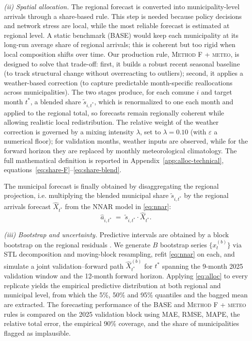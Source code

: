\documentclass[11pt,a4paper]{article}
\begin{document}
\medskip
\noindent\textit{(ii) Spatial allocation.} The regional forecast is converted into municipality-level arrivals through a share-based rule. This step is needed because policy decisions and network stress are local, while the most reliable forecast is estimated at regional level. A static benchmark (BASE) would keep each municipality at its long-run average share of regional arrivals; this is coherent but too rigid when local composition shifts over time. Our production rule, \textsc{Method F + meteo}, is designed to solve that trade-off: first, it builds a robust recent seasonal baseline (to track structural change without overreacting to outliers); second, it applies a weather-based correction (to capture predictable month-specific reallocations across municipalities). The two stages produce, for each comune $i$ and target month $t^{*}$, a blended share $\widetilde{s}_{i,t^{*}}$, which is renormalized to one each month and applied to the regional total, so forecasts remain regionally coherent while allowing realistic local redistribution. The relative weight of the weather correction is governed by a mixing intensity $\lambda$, set to $\lambda = 0.10$ (with $\varepsilon$ a numerical floor); for validation months, weather inputs are observed, while for the forward horizon they are replaced by monthly meteorological climatology. The full mathematical definition is reported in Appendix~\ref{app:alloc-technical}, equations~\eqref{eq:share-F}--\eqref{eq:share-blend}.

The municipal forecast is finally obtained by disaggregating the regional projection, i.e. multiplying the blended municipal share $\widetilde{s}_{i,t^{*}}$ by the regional arrivals forecast $\widehat{X}_{t^{*}}$ from the NNAR model in \eqref{eq:nnar}:
\begin{equation}
\label{eq:alloc}
\widehat{a}_{i,t^{*}} \;=\; \widetilde{s}_{i,t^{*}} \cdot \widehat{X}_{t^{*}}.
\end{equation}

\medskip
\noindent\textit{(iii) Bootstrap and uncertainty.} Predictive intervals are obtained by a block bootstrap on the regional residuals \citep{bergmeir2016}. We generate $B$ bootstrap series $\{x_t^{(b)}\}$ via STL decomposition and moving-block resampling, refit \eqref{eq:nnar} on each, and simulate a joint validation–forward path $\widehat{X}_{t^{*}}^{(b)}$ for $t^{*}$ spanning the 9-month 2025 validation window and the 12-month forward horizon. Applying \eqref{eq:alloc} to every replicate yields the empirical predictive distribution at both regional and municipal level, from which the 5\%, 50\% and 95\% quantiles and the bagged mean are extracted. The forecasting performance of the BASE and \textsc{Method F + meteo} rules is compared on the 2025 validation block using MAE, RMSE, MAPE, the relative total error, the empirical 90\% coverage, and the share of municipalities flagged as implausible.
\end{document}

